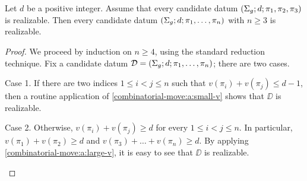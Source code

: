 \begin{proposition}\label{monodromy:th:reduction-to-n-3}
Let $d$ be a positive integer. Assume that every candidate datum $(\Sigma_{g};d;\pi_1,\pi_2,\pi_3)$ is realizable. Then every candidate datum $(\Sigma_{g};d;\pi_1,\ldots,\pi_n)$ with $n\ge 3$ is realizable.
\end{proposition}
\begin{proof}
We proceed by induction on $n\ge 4$, using the standard reduction technique. Fix a candidate datum $\mathcal{D}=(\Sigma_{g};d;\pi_1,\ldots,\pi_{n})$; there are two cases.
\begin{sideline}{Case 1.}
If there are two indices $1\le i<j\le n$ such that $v(\pi_i)+v(\pi_j)\le d-1$, then a routine application of \cref{combinatorial-move:a:small-v} shows that $\DD$ is realizable.
\end{sideline}
\begin{sideline}{Case 2.}
Otherwise, $v(\pi_i)+v(\pi_j)\ge d$ for every $1\le i<j\le n$. In particular, $v(\pi_1)+v(\pi_2)\ge d$ and $v(\pi_3)+\ldots+v(\pi_n)\ge d$. By applying \cref{combinatorial-move:a:large-v}, it is easy to see that $\DD$ is realizable.\qedhere
\end{sideline}
\end{proof}